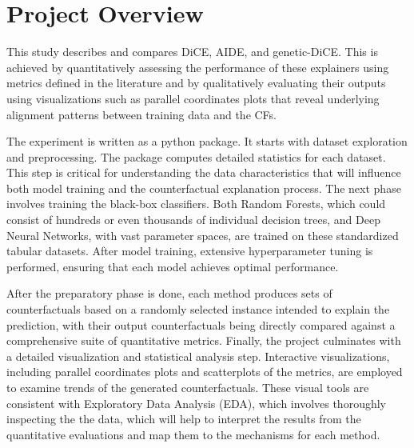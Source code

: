 \section{Project Overview}
This study describes and compares DiCE, AIDE, and genetic-DiCE. This is achieved by quantitatively assessing the performance of these explainers using metrics defined in the literature and by qualitatively evaluating their outputs using visualizations such as parallel coordinates plots that reveal underlying alignment patterns between training data and the CFs.

The experiment is written as a python package. It starts with dataset exploration and preprocessing. The package computes detailed statistics for each dataset. This step is critical for understanding the data characteristics that will influence both model training and the counterfactual explanation process. The next phase involves training the black-box classifiers. Both Random Forests, which could consist of hundreds or even thousands of individual decision trees, and Deep Neural Networks, with vast parameter spaces, are trained on these standardized tabular datasets. After model training, extensive hyperparameter tuning is performed, ensuring that each model achieves optimal performance.

After the preparatory phase is done, each method produces sets of counterfactuals based on a randomly selected instance intended to explain the prediction, with their output counterfactuals being directly compared against a comprehensive suite of quantitative metrics. Finally, the project culminates with a detailed visualization and statistical analysis step. Interactive visualizations, including parallel coordinates plots and scatterplots of the metrics, are employed to examine trends of the generated counterfactuals. These visual tools are consistent with Exploratory Data Analysis (EDA), which involves thoroughly inspecting the the data, which will help to interpret the results from the quantitative evaluations and map them to the mechanisms for each method.

